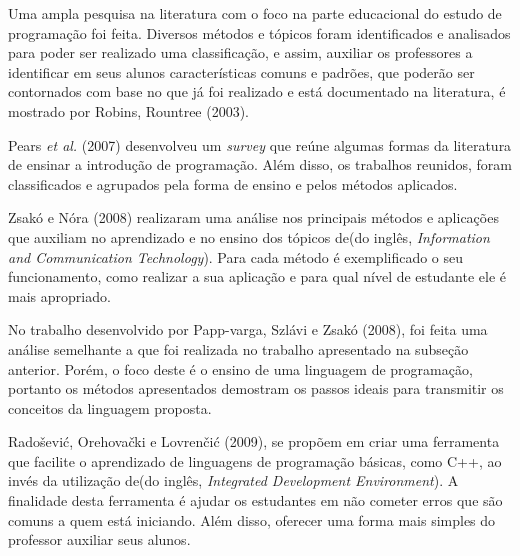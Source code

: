 \nocite{doi:10.1076/csed.13.2.137.14200} 
Uma ampla pesquisa na literatura com o foco na parte educacional do estudo de programação foi feita. Diversos métodos e tópicos foram identificados e analisados para poder ser realizado uma classificação, e assim, auxiliar os professores a identificar em seus alunos características comuns e padrões, que poderão ser contornados com base no que já foi realizado e está documentado na literatura, é mostrado por Robins, Rountree (2003).

\nocite{Pears:2007:SLT:1345443.1345441}
Pears \textit{et al.} (2007) desenvolveu um \textit{survey} que reúne algumas formas da literatura de ensinar a introdução de programação. Além disso, os trabalhos reunidos, foram classificados e agrupados pela forma de ensino e pelos métodos aplicados.


\nocite{teachingapplications} 
Zsakó e Nóra (2008) realizaram uma análise nos principais métodos e aplicações que auxiliam no aprendizado e no ensino dos tópicos de(do inglês, \textit{Information and Communication Technology}). Para cada método é exemplificado o seu funcionamento, como realizar a sua aplicação e para qual nível de estudante ele é mais apropriado. 


\nocite{teachingapplicationslanguages} 
No trabalho desenvolvido por Papp-varga, Szlávi e Zsakó (2008), foi feita uma análise semelhante a que foi realizada no trabalho apresentado na subseção anterior. Porém, o foco deste é o ensino de uma linguagem de programação, portanto os métodos apresentados demostram os passos ideais para transmitir os conceitos da linguagem proposta.

\nocite{newapproach} 
Radošević, Orehovački e Lovrenčić (2009), se propõem em criar uma ferramenta que facilite o aprendizado de linguagens de programação básicas, como C++, ao invés da utilização de(do inglês, \textit{Integrated Development Environment}). A finalidade desta ferramenta é ajudar os estudantes em não cometer erros que são comuns a quem está iniciando. Além disso, oferecer uma forma mais simples do professor auxiliar seus alunos.

